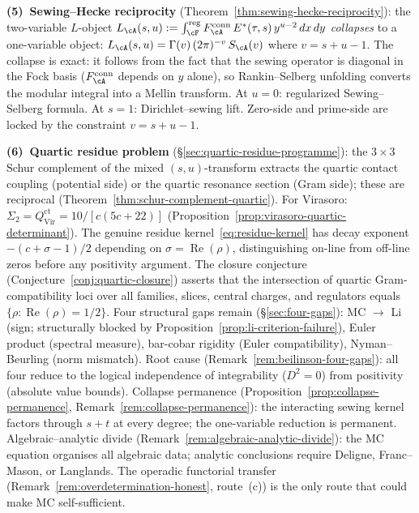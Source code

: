 \smallskip\noindent
\textbf{(5)~Sewing--Hecke reciprocity}
(Theorem~\ref{thm:sewing-hecke-reciprocity}):
the two-variable $L$-object
$L_\cA(s,u) := \int_\cF^{\mathrm{reg}}
F_\cA^{\mathrm{conn}}\,E^*(\tau,s)\,
y^{u-2}\,dx\,dy$
\emph{collapses} to a one-variable object:
$L_\cA(s,u) = \Gamma(v)\,(2\pi)^{-v}\,S_\cA(v)$
where $v = s + u - 1$.
The collapse is exact: it follows from the fact that the
sewing operator is diagonal in the Fock basis
($F_\cA^{\mathrm{conn}}$ depends on $y$ alone),
so Rankin--Selberg unfolding converts the modular integral
into a Mellin transform.
At $u = 0$: regularized Sewing--Selberg formula.
At $s = 1$: Dirichlet--sewing lift.
Zero-side and prime-side are locked by the
constraint $v = s + u - 1$.

\smallskip\noindent
\textbf{(6)~Quartic residue problem}
(\S\ref{sec:quartic-residue-programme}):
the $3 \times 3$ Schur complement of the mixed
$(s,u)$-transform extracts the quartic contact coupling
(potential side) or the quartic resonance section (Gram side);
these are reciprocal (Theorem~\ref{thm:schur-complement-quartic}).
For Virasoro: $\Sigma_2 = Q_{\mathrm{Vir}}^{\mathrm{ct}}
= 10/[c(5c{+}22)]$
(Proposition~\ref{prop:virasoro-quartic-determinant}).
The genuine residue kernel~\eqref{eq:residue-kernel} has
decay exponent $-(c{+}\sigma{-}1)/2$ depending on
$\sigma = \operatorname{Re}(\rho)$, distinguishing on-line
from off-line zeros before any positivity argument.
The closure conjecture
(Conjecture~\ref{conj:quartic-closure})
asserts that the intersection of quartic
Gram-compatibility loci over all families, slices, central
charges, and regulators equals
$\{\rho : \operatorname{Re}(\rho) = 1/2\}$.
Four structural gaps remain
(\S\ref{sec:four-gaps}):
MC $\to$ Li (sign; structurally blocked by
Proposition~\ref{prop:li-criterion-failure}),
Euler product (spectral measure),
bar-cobar rigidity (Euler compatibility),
Nyman--Beurling (norm mismatch).
Root cause (Remark~\ref{rem:beilinson-four-gaps}):
all four reduce to the logical independence of
integrability ($D^2 = 0$) from positivity
(absolute value bounds).
Collapse permanence
(Proposition~\ref{prop:collapse-permanence},
Remark~\ref{rem:collapse-permanence}): the interacting
sewing kernel factors through $s{+}t$ at every degree;
the one-variable reduction is permanent.
Algebraic--analytic divide
(Remark~\ref{rem:algebraic-analytic-divide}): the MC
equation organises all algebraic data; analytic
conclusions require Deligne, Franc--Mason, or Langlands.
The operadic functorial transfer
(Remark~\ref{rem:overdetermination-honest}, route~(c))
is the only route that could make MC self-sufficient.

